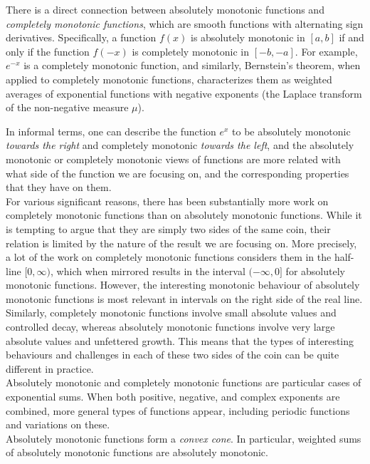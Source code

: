 \documentclass[12pt,a4paper]{article}
\begin{document}
There is a direct connection between absolutely monotonic functions and {\emph{completely monotonic functions}}, which are smooth functions with alternating sign derivatives. Specifically, a function $f(x)$ is absolutely monotonic in $[a,b]$ if and only if the function $f(-x)$ is completely monotonic in $[-b,-a]$. For example, $e^{-x}$ is a completely monotonic function, and similarly, Bernstein's theorem, when applied to completely monotonic functions, characterizes them as weighted averages of exponential functions with negative exponents (the Laplace transform of the non-negative measure $\mu$).

In informal terms, one can describe the function $e^x$ to be absolutely monotonic {\emph{towards the right}} and completely monotonic {\emph{towards the left}}, and the absolutely monotonic or completely monotonic views of functions are more related with what side of the function we are focusing on, and the corresponding properties that they have on them.\\

For various significant reasons, there has been substantially more work on completely monotonic functions than on absolutely monotonic functions. While it is tempting to argue that they are simply two sides of the same coin, their relation is limited by the nature of the result we are focusing on. More precisely, a lot of the work on completely monotonic functions considers them in the half-line $[0,\infty)$, which when mirrored results in the interval $(-\infty,0]$ for absolutely monotonic functions. However, the interesting monotonic behaviour of absolutely monotonic functions is most relevant in intervals on the right side of the real line. Similarly, completely monotonic functions involve small absolute values and controlled decay, whereas absolutely monotonic functions involve very large absolute values and unfettered growth. This means that the types of interesting behaviours and challenges in each of these two sides of the coin can be quite different in practice.\\

Absolutely monotonic and completely monotonic functions are particular cases of exponential sums. When both positive, negative, and complex exponents are combined, more general types of functions appear, including periodic functions and variations on these.\\

Absolutely monotonic functions form a {\emph{convex cone}}. In particular, weighted sums of absolutely monotonic functions are absolutely monotonic.
\end{document}
